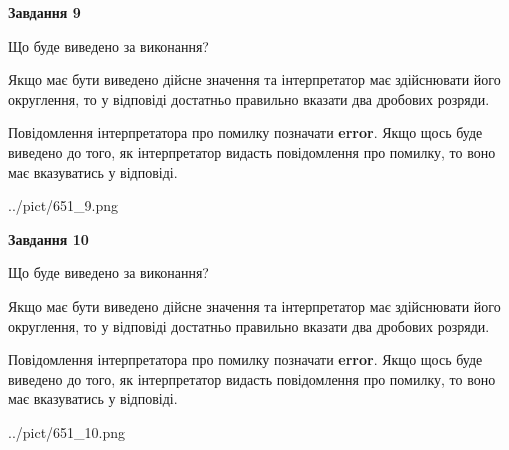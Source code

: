 \documentclass[12pt, ukrainian]{article}
\begin{document}
{\begin {Large}
{\begin {center}\textbf{Завдання 9}\end {center}}\par
Що буде виведено за виконання? \par

Якщо має бути виведено дійсне значення та інтерпретатор має здійснювати його округлення, 
то у відповіді достатньо правильно вказати два дробових розряди.

Повідомлення інтерпретатора про помилку позначати \textbf{error}.
Якщо щось буде виведено до того, як інтерпретатор видасть повідомлення про помилку, 
то воно має вказуватись у відповіді. \par

\begin{center}
	{../pict/651_9.png}
\end{center}
\newpage

{\begin {center}\textbf{Завдання 10}\end {center}}\par
Що буде виведено за виконання? \par

Якщо має бути виведено дійсне значення та інтерпретатор має здійснювати його округлення, 
то у відповіді достатньо правильно вказати два дробових розряди.

Повідомлення інтерпретатора про помилку позначати \textbf{error}.
Якщо щось буде виведено до того, як інтерпретатор видасть повідомлення про помилку, 
то воно має вказуватись у відповіді. \par

\begin{center}
	{../pict/651_10.png}
\end{center}
\newpage

\end {Large}}
\end{document}
